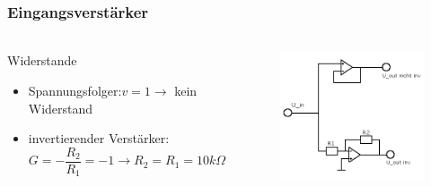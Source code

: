 \begin{frame}
\frametitle{Eingangsverstärker}
\framesubtitle{}
    \begin{columns}[c]
            \begin{block}{Widerstande}
                \begin{itemize}
                    \item Spannungsfolger:$v=1 \rightarrow$ kein Widerstand
                    \item invertierender Verstärker: 
                    \begin{equation*}
                    G= - \frac{R_2}{R_1} = -1 \rightarrow R_2 = R_1 = 10k\Omega
                    \end{equation*}
                \end{itemize}
            \end{block}
            \begin{figure}[H]
            \begin{center}
                    \includegraphics[scale=0.4]{./img/schaltung/Verstaerker.png}
            \end{center}
            \end{figure}
    \end{columns}
\end{frame}
